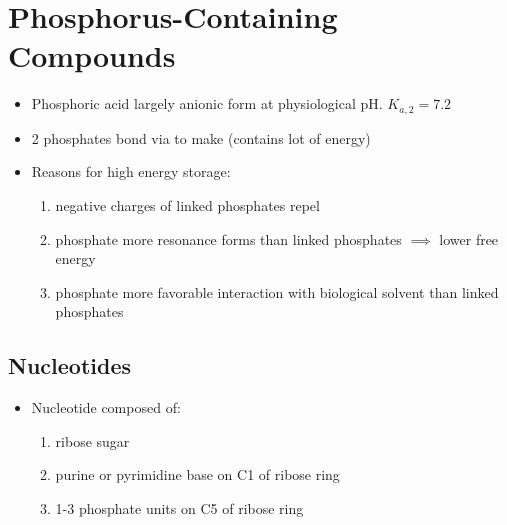 \documentclass[../Bio_chemistryReview.tex]{subfiles}
\begin{document}
\section{Phosphorus-Containing Compounds}

\begin{itemize}
  \item Phosphoric acid largely anionic form at physiological pH. $K_{a,2}=7.2$
  \item 2 phosphates bond via  to make
     (contains lot of energy) 
  \item Reasons for high energy storage:
    \begin{enumerate}
      \item negative charges of linked phosphates repel
      \item phosphate more resonance forms than linked phosphates $\implies$
        lower free energy 
      \item phosphate more favorable interaction with biological solvent than
        linked phosphates
    \end{enumerate}
\end{itemize}

\subsection{Nucleotides}

\begin{itemize}
  \item Nucleotide composed of:
    \begin{enumerate}
      \item ribose sugar
      \item purine or pyrimidine base on C1 of ribose ring
      \item 1-3 phosphate units on C5 of ribose ring 
    \end{enumerate}
\end{itemize}
\end{document}
